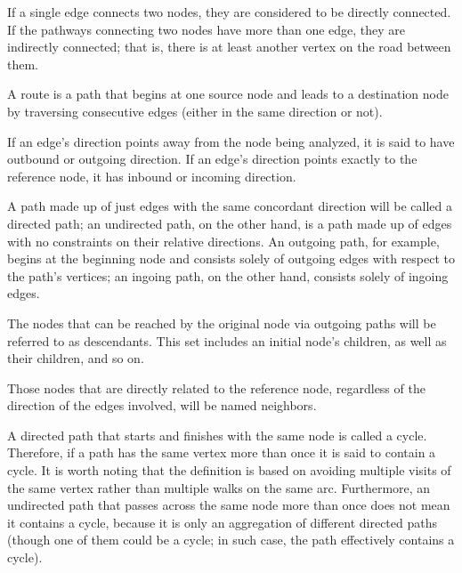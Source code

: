 \begin{remark}\label{remark:onconnectednodes}
	If a single edge connects two nodes, they are considered to be directly connected.
	If the pathways connecting two nodes have more than one edge, they are indirectly connected;
	that is, there is at least another vertex on the road between them.
\end{remark}
	
\begin{remark}[on paths]\label{remark:onpaths}
	A route is a path that begins at one source node and leads to a destination node by traversing consecutive edges (either in the same direction or not).
\end{remark}
	
\begin{remark}\label{remark:onoutboundandinbounddirections}
	If an edge's direction points away from the node being analyzed, it is said to have outbound or outgoing direction.
	If an edge's direction points exactly to the reference node, it has inbound or incoming direction.
\end{remark}
	
\begin{remark}\label{remark:ondirectedpaths}
	A path made up of just edges with the same concordant direction will be called a directed path; an undirected path, on the other hand, is a path made up of edges with no constraints on their relative directions.
	An outgoing path, for example, begins at the beginning node and consists solely of outgoing edges with respect to the path's vertices;
	an ingoing path, on the other hand, consists solely of ingoing edges.
\end{remark}
	
\begin{remark}[on descendants]\label{remark:ondescendants}
	The nodes that can be reached by the original node via outgoing paths will be referred to as descendants.
	This set includes an initial node's children, as well as their children, and so on.
\end{remark}
	
\begin{remark}[on neighbors]\label{remark:onneighbors}
	Those nodes that are directly related to the reference node, regardless of the direction of the edges involved, will be named neighbors.
\end{remark}
	
\begin{remark}[on cycles]\label{remark:oncycles}
	A directed path that starts and finishes with the same node is called a cycle.
	Therefore, if a path has the same vertex more than once it is said to contain a cycle.
	It is worth noting that the definition is based on avoiding multiple visits of the same vertex rather than multiple walks on the same arc. 
	Furthermore, an undirected path that passes across the same node more than once does not mean it contains a cycle, because it is only an aggregation of different directed paths (though one of them could be a cycle;
	in such case, the path effectively contains a cycle).
\end{remark}
	
